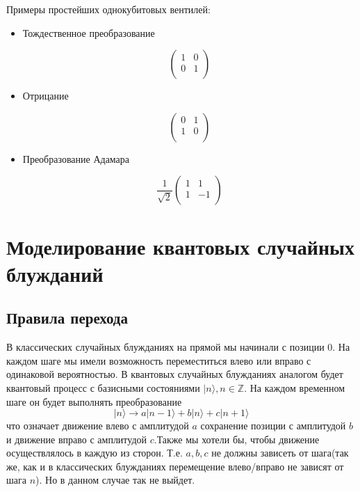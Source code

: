 \documentclass[a4paper]{report}
\begin{document}
Примеры простейших однокубитовых вентилей:
\begin{itemize}
  \item Тождественное преобразование

    $$
        \left(
          \begin{array}{cc}
              1 & 0 \\
              0 & 1 \\
          \end{array}
        \right)
    $$

  \item Отрицание

  $$
        \left(
          \begin{array}{cc}
              0 & 1 \\
              1 & 0 \\
          \end{array}
        \right)
  $$

  \item Преобразование Адамара

  $$
        \frac{1}{\sqrt{2}}
        \left(
          \begin{array}{cc}
              1 & 1 \\
              1 & -1 \\
          \end{array}
        \right)
  $$

\end{itemize}




\chapter{Моделирование квантовых случайных блужданий}




\section{Правила перехода}

В классических случайных блужданиях на прямой мы начинали с позиции 0. На каждом шаге мы имели возможность переместиться влево или вправо с одинаковой вероятностью. В квантовых случайных блужданиях аналогом будет квантовый процесс с базисными состояниями
$|n\rangle, n \in \mathbb{Z} $. На каждом временном шаге он будет выполнять преобразование
\begin{equation} \label{eq:3}
    |n\rangle \rightarrow a|n - 1\rangle +  b|n\rangle + c| n + 1\rangle
\end{equation}
что означает движение влево с амплитудой $a$ сохранение позиции с амплитудой $b$ и движение вправо с амплитудой $c$.Также мы хотели бы, чтобы движение осуществлялось в каждую из сторон. Т.е. $a, b, c$ не должны зависеть от шага(так же, как и в классических блужданиях перемещение влево/вправо не зависят от шага $n$). Но в данном случае так не выйдет.
\end{document}
